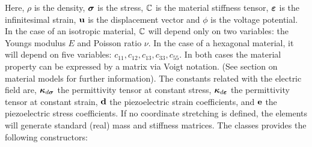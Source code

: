 Here, $\rho$ is the density, $\boldsymbol{\sigma}$ is the stress, $\mathbb{C}$ is the
material stiffness tensor, $\boldsymbol{\varepsilon}$ is the infinitesimal strain, 
$\mathbf{u}$ is the displacement vector and $\phi$ is the voltage potential.
In the case of an isotropic material,
$\mathbb{C}$ will depend only on two variables: the Youngs modulus $E$ and 
Poisson ratio $\nu$. In the case of a hexagonal material, it will depend
on five variables: $c_{11},c_{12},c_{13},c_{33},c_{55}$.  In both cases 
the material property can be expressed by a matrix via Voigt notation. 
(See section on material models for further information). The constants
related with the electric field are, $\boldsymbol{\kappa}_{d\boldsymbol{\sigma}}$ the permittivity
tensor at constant stress, $\boldsymbol{\kappa}_{d\boldsymbol{\varepsilon}}$ the permittivity tensor
at constant strain, $\mathbf{d}$ the piezoelectric strain coefficients,
and $\mathbf{e}$ the piezoelectric stress coefficients. 
If no coordinate stretching is defined, the elements will generate 
standard (real) mass and stiffness matrices.
The classes provides the following constructors:
